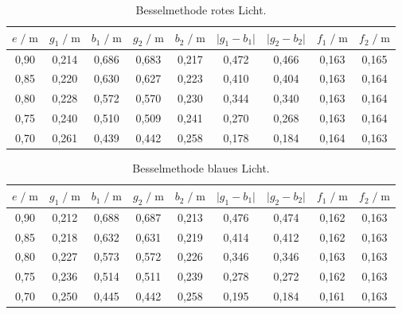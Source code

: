 \begin{table}
    \centering
    \caption{Besselmethode rotes Licht.}
    \label{tab:mess3}
    \begin{tabular}{c c c c c c c c c}
    \toprule
    $ e \;/\; \si{\meter} $ & $g_1 \;/\; \si{\meter}$ &
    $ b_1 \;/\; \si{\meter}$ & $g_2 \;/\; \si{\meter}$ & 
    $ b_2 \;/\; \si{\meter}$ & $\vert g_1 - b_1 \vert$ & 
    $ \vert g_2 - b_2 \vert$ & $ f_1 \;/\; \si{\meter}$ &
    $ f_2 \;/\; \si{\meter}$\\
    \midrule 
        0,90 & 0,214 & 0,686 & 0,683 & 0,217 & 0,472 & 0,466 & 0,163 & 0,165\\
        0,85 & 0,220 & 0,630 & 0,627 & 0,223 & 0,410 & 0,404 & 0,163 & 0,164\\
        0,80 & 0,228 & 0,572 & 0,570 & 0,230 & 0,344 & 0,340 & 0,163 & 0,164\\
        0,75 & 0,240 & 0,510 & 0,509 & 0,241 & 0,270 & 0,268 & 0,163 & 0,164\\
        0,70 & 0,261 & 0,439 & 0,442 & 0,258 & 0,178 & 0,184 & 0,164 & 0,163\\         
    \bottomrule
    \end{tabular}
    \end{table}

\begin{table}
    \centering
    \caption{Besselmethode blaues Licht.}
    \label{tab:mess4}
    \begin{tabular}{c c c c c c c c c}
    \toprule
    $ e \;/\; \si{\meter} $ & $g_1 \;/\; \si{\meter}$ &
    $ b_1 \;/\; \si{\meter}$ & $g_2 \;/\; \si{\meter}$ & 
    $ b_2 \;/\; \si{\meter}$ & $\vert g_1 - b_1 \vert$ & 
    $ \vert g_2 - b_2 \vert$ & $ f_1 \;/\; \si{\meter}$ &
    $ f_2 \;/\; \si{\meter}$\\
    \midrule 
        0,90 & 0,212 & 0,688 & 0,687 & 0,213 & 0,476 & 0,474 & 0,162 & 0,163\\
        0,85 & 0,218 & 0,632 & 0,631 & 0,219 & 0,414 & 0,412 & 0,162 & 0,163\\
        0,80 & 0,227 & 0,573 & 0,572 & 0,226 & 0,346 & 0,346 & 0,163 & 0,163\\
        0,75 & 0,236 & 0,514 & 0,511 & 0,239 & 0,278 & 0,272 & 0,162 & 0,163\\
        0,70 & 0,250 & 0,445 & 0,442 & 0,258 & 0,195 & 0,184 & 0,161 & 0,163\\         
    \bottomrule
    \end{tabular}
\end{table}

